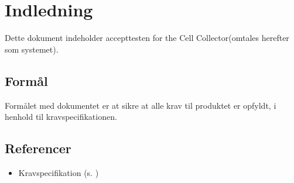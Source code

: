 \section{Indledning}
Dette dokument indeholder accepttesten for the Cell Collector(omtales herefter som systemet). 

\subsection{Formål}
Formålet med dokumentet er at sikre at alle krav til produktet er opfyldt, i henhold til kravspecifikationen.

\subsection{Referencer}
\begin{itemize}
\item Kravspecifikation (s. \pageref{ch:ks})
\end{itemize}